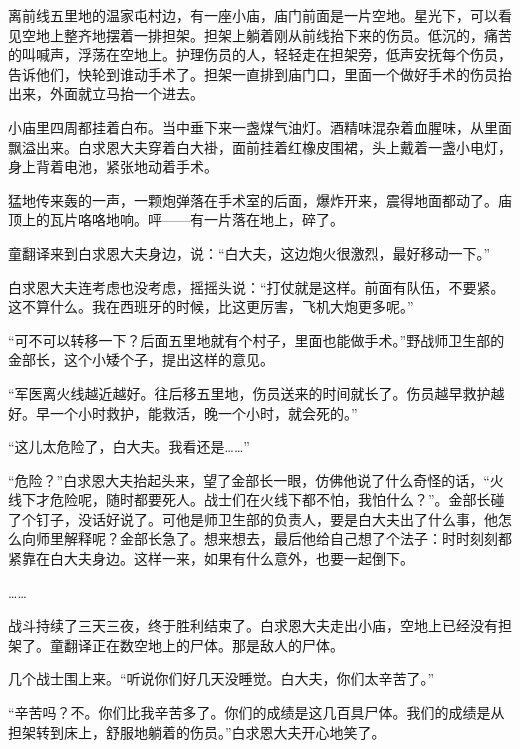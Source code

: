 \documentclass[12pt,UTF-8,openany]{ctexbook}
\begin{document}
\begin{large}
    
    离前线五里地的温家屯村边，有一座小庙，庙门前面是一片空地。星光下，可以看见空地上整齐地摆着一排担架。担架上躺着刚从前线抬下来的伤员。低沉的，痛苦的叫喊声，浮荡在空地上。护理伤员的人，轻轻走在担架旁，低声安抚每个伤员，告诉他们，快轮到谁动手术了。担架一直排到庙门口，里面一个做好手术的伤员抬出来，外面就立马抬一个进去。
    
    小庙里四周都挂着白布。当中垂下来一盏煤气油灯。酒精味混杂着血腥味，从里面飘溢出来。白求恩大夫穿着白大褂，面前挂着红橡皮围裙，头上戴着一盏小电灯，身上背着电池，紧张地动着手术。
    
    猛地传来轰的一声，一颗炮弹落在手术室的后面，爆炸开来，震得地面都动了。庙顶上的瓦片咯咯地响。呯——有一片落在地上，碎了。
    
    童翻译来到白求恩大夫身边，说：“白大夫，这边炮火很激烈，最好移动一下。”
    
    白求恩大夫连考虑也没考虑，摇摇头说：“打仗就是这样。前面有队伍，不要紧。这不算什么。我在西班牙的时候，比这更厉害，飞机大炮更多呢。”
    
    “可不可以转移一下？后面五里地就有个村子，里面也能做手术。”野战师卫生部的金部长，这个小矮个子，提出这样的意见。
    
    “军医离火线越近越好。往后移五里地，伤员送来的时间就长了。伤员越早救护越好。早一个小时救护，能救活，晚一个小时，就会死的。”
    
    “这儿太危险了，白大夫。我看还是……”
    
    “危险？”白求恩大夫抬起头来，望了金部长一眼，仿佛他说了什么奇怪的话，“火线下才危险呢，随时都要死人。战士们在火线下都不怕，我怕什么？”。金部长碰了个钉子，没话好说了。可他是师卫生部的负责人，要是白大夫出了什么事，他怎么向师里解释呢？金部长急了。想来想去，最后他给自己想了个法子：时时刻刻都紧靠在白大夫身边。这样一来，如果有什么意外，也要一起倒下。
    
    ……
    
    战斗持续了三天三夜，终于胜利结束了。白求恩大夫走出小庙，空地上已经没有担架了。童翻译正在数空地上的尸体。那是敌人的尸体。
    
    几个战士围上来。“听说你们好几天没睡觉。白大夫，你们太辛苦了。”
    
    “辛苦吗？不。你们比我辛苦多了。你们的成绩是这几百具尸体。我们的成绩是从担架转到床上，舒服地躺着的伤员。”白求恩大夫开心地笑了。
    
\end{large}
\end{document}
